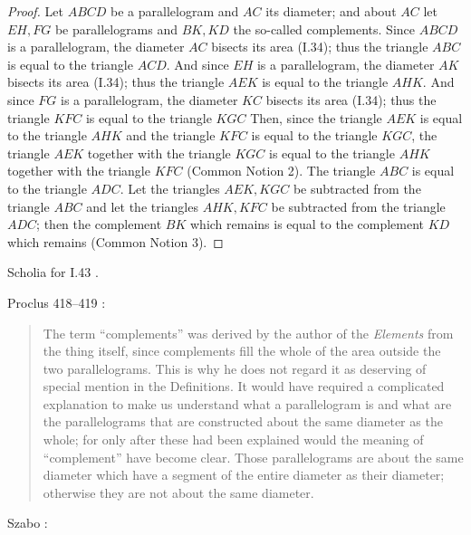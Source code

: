 \documentclass{article}
\begin{document}
\begin{proof}
Let $ABCD$ be a parallelogram and $AC$ its diameter; and about
$AC$ let $EH,FG$ be parallelograms and $BK,KD$ the so-called complements.
Since $ABCD$ is a parallelogram, the diameter $AC$ bisects its area (I.34); thus the triangle $ABC$ is equal to the triangle
$ACD$. And since $EH$ is a parallelogram, the diameter $AK$ bisects its area (I.34); thus the triangle $AEK$ is equal to the
triangle $AHK$. And since $FG$ is a parallelogram, the diameter $KC$ bisects its area (I.34); thus the triangle
$KFC$ is equal to the triangle $KGC$
Then, since the triangle $AEK$ is equal to the triangle $AHK$ and the triangle
$KFC$ is equal to the triangle $KGC$, the triangle $AEK$ together with the triangle $KGC$ is equal to the triangle
$AHK$ together with the triangle $KFC$ (Common Notion 2).
The triangle $ABC$ is equal to the triangle $ADC$. Let the triangles $AEK,KGC$ be subtracted from the triangle $ABC$ and let
the triangles $AHK,KFC$ be subtracted from the triangle $ADC$; then the complement $BK$ which remains is equal
to the complement $KD$ which remains (Common Notion 3). 
\end{proof}

Scholia for I.43 \cite[pp.~201--203]{euclidisV}.

Proclus 418--419 \cite[p.~331]{proclus}:

\begin{quote}
The term ``complements'' was derived by the author of the 
{\em Elements} from the thing itself, since complements fill the
whole of the area outside the two parallelograms. This is why
he does not regard it as deserving of special mention in the
Definitions. It would have required a complicated explanation
to make us understand what a parallelogram is and what are
the parallelograms that are constructed about the same diameter
as the whole; for only after these had been explained
would the meaning of ``complement'' have become clear.
Those parallelograms are about the same diameter which have
a segment of the entire diameter as their diameter; otherwise
they are not about the same diameter. 
\end{quote}

Szabo \cite[pp.~344--345]{szabo}:
\end{document}
